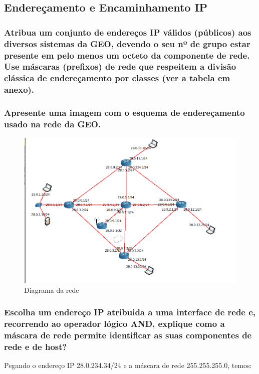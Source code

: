 \documentclass{article}
\begin{document}
\subsection{Endereçamento e Encaminhamento IP}
\subsubsection{Atribua um conjunto de endereços IP válidos (públicos) aos diversos sistemas da
GEO, devendo o seu nº de grupo estar presente em pelo menos um octeto da
componente de rede. Use máscaras (prefixos) de rede que respeitem a divisão
clássica de endereçamento por classes (ver a tabela em anexo).}

\subsubsection{Apresente uma imagem com o esquema de endereçamento usado na
rede da GEO.}

\begin{figure}[h]
    \centering
    \includegraphics[width=1\textwidth]{images/aularedes.png}
    \caption{\label{fig:pacote}Diagrama da rede}
\end{figure}

\subsubsection{Escolha um endereço IP atribuida a uma interface de rede e, recorrendo
ao operador lógico AND, explique como a máscara de rede permite
identificar as suas componentes de rede e de host?}

Pegando o endereço IP 28.0.234.34/24 e a máscara de rede 255.255.255.0, temos:
\end{document}

